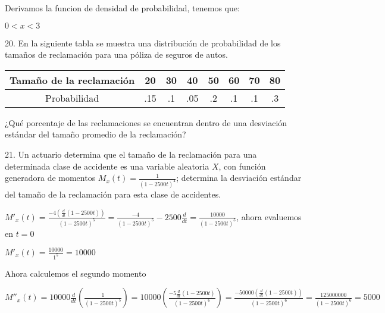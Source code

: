 \documentclass{article}
\begin{document}
        Derivamos la funcion de densidad de probabilidad, tenemos que:\vspace{.1cm}

        $0 < x < 3$

        20. En la siguiente tabla se muestra una distribución de 
        probabilidad de los tamaños de reclamación para una 
        póliza de seguros de autos. \vspace{.1cm}
        
        \begin{center}
            \begin{tabular}{| c | c | c | c | c | c | c | c |}
                \hline
                Tamaño de la reclamación & 20 & 30 & 40 & 50 & 60 & 70 & 80\\ \hline
                Probabilidad & .15 & .1 & .05 & .2 & .1 & .1 & .3\\ \hline
            \end{tabular} \vspace{.1cm}    
        \end{center}

        ¿Qué porcentaje de las reclamaciones se encuentran dentro 
        de una desviación estándar del tamaño promedio de la 
        reclamación?\vspace{.3cm}

        21. Un actuario determina que el tamaño de la reclamación 
        para una determinada clase de accidente es una variable 
        aleatoria $X$, con función generadora de momentos 
        $M_x(t)=\frac{1}{(1-2500t)^4}$; determina la desviación 
        estándar del tamaño de la reclamación para esta clase de 
        accidentes.\vspace{.1cm}

        \vspace{.1cm}

        $M'_x(t)=\frac{-4(\frac{d}{dt}(1-2500t))}{(1-2500t)^5} 
        = \frac{-4}{(1-2500t)^5}-2500\frac{d}{dt} = \frac{10000}{(1-2500t)^5}$, 
        ahora evaluemos en $t=0$ \vspace{.1cm}

        $M'_x(t) = \frac{10000}{1^5}= 10000$\vspace{.1cm}

        Ahora calculemos el segundo momento\vspace{.1cm}

        $M''_x(t) = 10000 \frac{d}{dt}(\frac{1}{(1-2500t)^5}) = 
        10000 (\frac{-5\frac{d}{dt}(1-2500t)}{(1-2500t)^6}) = 
        \frac{-50000(\frac{d}{dt}(1-2500t))}{(1-2500t)^6} = 
        \frac{125000000}{(1-2500t)^6} = 5000$ \vspace{.1cm}
\end{document}
